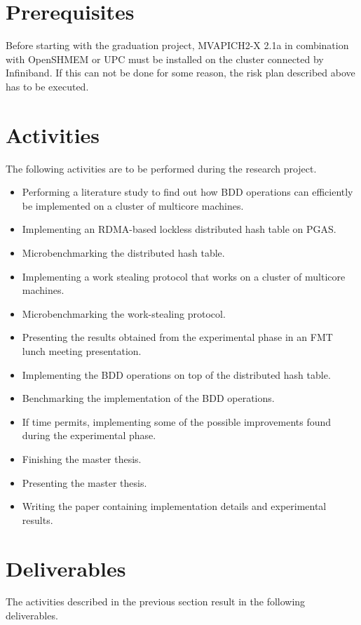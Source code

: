 \section{Prerequisites}
Before starting with the graduation project, MVAPICH2-X 2.1a in combination with OpenSHMEM or UPC must be installed on the cluster connected by Infiniband. If this can not be done for some reason, the risk plan described above has to be executed.

\section{Activities}
The following activities are to be performed during the research project.

\begin{itemize}
	\item Performing a literature study to find out how BDD operations can efficiently be implemented on a cluster of multicore machines.
	\item Implementing an RDMA-based lockless distributed hash table on PGAS.
	\item Microbenchmarking the distributed hash table.
	\item Implementing a work stealing protocol that works on a cluster of multicore machines.
	\item Microbenchmarking the work-stealing protocol.
	\item Presenting the results obtained from the experimental phase in an FMT lunch meeting presentation.
	\item Implementing the BDD operations on top of the distributed hash table.
	\item Benchmarking the implementation of the BDD operations.
	\item If time permits, implementing some of the possible improvements found during the experimental phase.
	\item Finishing the master thesis.
	\item Presenting the master thesis.
	\item Writing the paper containing implementation details and experimental results.
\end{itemize}

\section{Deliverables}
The activities described in the previous section result in the following deliverables.

